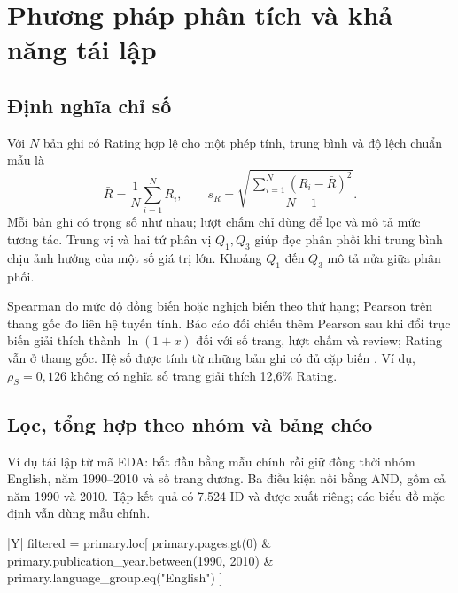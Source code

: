 \documentclass[11pt,a4paper]{article}
\makeatletter
\newcommand{\captionof}[2]{\def\@captype{#1}\caption{#2}}
\newenvironment{reporttable}{\par\medskip\noindent\begin{minipage}{\linewidth}\small\setlength{\tabcolsep}{4pt}\renewcommand{\arraystretch}{1.18}}{\end{minipage}\par\smallskip}
\makeatother
\begin{document}
\clearpage
\section{Phương pháp phân tích và khả năng tái lập}
\subsection{Định nghĩa chỉ số}
Với \(N\) bản ghi có Rating hợp lệ cho một phép tính, trung bình và độ lệch chuẩn mẫu là
\[
  \bar R = \frac{1}{N}\sum_{i=1}^{N} R_i,
  \qquad
  s_R = \sqrt{\frac{\sum_{i=1}^{N}(R_i-\bar R)^2}{N-1}}.
\]
Mỗi bản ghi có trọng số như nhau; lượt chấm chỉ dùng để lọc và mô tả mức tương tác. Trung vị và hai tứ phân vị \(Q_1,Q_3\) giúp đọc phân phối khi trung bình chịu ảnh hưởng của một số giá trị lớn. Khoảng \(Q_1\) đến \(Q_3\) mô tả nửa giữa phân phối.

Spearman đo mức độ đồng biến hoặc nghịch biến theo thứ hạng; Pearson trên thang gốc đo liên hệ tuyến tính. Báo cáo đối chiếu thêm Pearson sau khi đổi trục biến giải thích thành \(\ln(1+x)\) đối với số trang, lượt chấm và review; Rating vẫn ở thang gốc. Hệ số được tính từ những bản ghi có đủ cặp biến \cite{pandas}. Ví dụ, \(\rho_S=0{,}126\) không có nghĩa số trang giải thích 12,6\% Rating.

\subsection{Lọc, tổng hợp theo nhóm và bảng chéo}
Ví dụ tái lập từ mã EDA: bắt đầu bằng mẫu chính rồi giữ đồng thời nhóm English, năm 1990–2010 và số trang dương. Ba điều kiện nối bằng AND, gồm cả năm 1990 và 2010. Tập kết quả có 7.524 ID và được xuất riêng; các biểu đồ mặc định vẫn dùng mẫu chính.

\begin{reporttable}
\captionof{table}{Ví dụ lọc kết hợp điều kiện trong Pandas}\label{tab:filtercode}
\begin{tabularx}{\linewidth}{|Y|}
\hline
\begingroup\ttfamily
filtered = primary.loc[\newline
\hspace*{1em}primary.pages.gt(0)\newline
\hspace*{1em}\& primary.publication\_year.between(1990, 2010)\newline
\hspace*{1em}\& primary.language\_group.eq("English")\newline
]
\endgroup \\\hline
\end{tabularx}
\end{reporttable}
\end{document}
